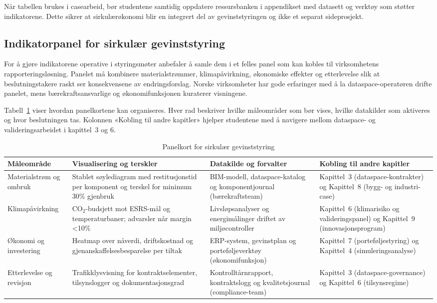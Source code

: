 Når tabellen brukes i casearbeid, bør studentene samtidig oppdatere ressursbanken i appendikset med datasett og verktøy som støtter indikatorene. Dette sikrer at sirkulærøkonomi blir en integrert del av gevinststyringen og ikke et separat sideprosjekt.

\subsection*{Indikatorpanel for sirkulær gevinststyring}
For å gjøre indikatorene operative i styringsmøter anbefaler \citet{miljodir2024indikatorveileder} å samle dem i et felles panel som kan kobles til virksomhetens rapporteringsløsning. Panelet må kombinere materialstrømmer, klimapåvirkning, økonomiske effekter og etterlevelse slik at beslutningstakere raskt ser konsekvensene av endringsforslag. Norske virksomheter har gode erfaringer med å la dataspace-operatøren drifte panelet, mens bærekraftsansvarlige og økonomifunksjonen kuraterer visningene.\citep{dfo2023baerekraft,hydro2023traceability}

Tabell~\ref{tab:sirkular-panel} viser hvordan panelkortene kan organiseres. Hver rad beskriver hvilke måleområder som bør vises, hvilke datakilder som aktiveres og hvor beslutningen tas. Kolonnen «Kobling til andre kapitler» hjelper studentene med å navigere mellom dataspace- og valideringsarbeidet i kapittel~3 og 6.

\begin{table}[h]
    \centering
    \caption{Panelkort for sirkulær gevinststyring}
    \label{tab:sirkular-panel}
    \begin{tabular}{p{3.1cm}p{3.8cm}p{3.6cm}p{3.4cm}}
        \toprule
        Måleområde & Visualisering og terskler & Datakilde og forvalter & Kobling til andre kapitler \\
        \midrule
        Materialstrøm og ombruk & Stablet søylediagram med restitusjonstid per komponent og terskel for minimum 30\% gjenbruk & BIM-modell, dataspace-katalog og komponentjournal (bærekraftsteam) & Kapittel~3 (dataspace-kontrakter) og Kapittel~8 (bygg- og industri-case) \\
        \addlinespace
        Klimapåvirkning & CO$_2$-budsjett mot ESRS-mål og temperaturbaner; advarsler når margin <10\% & Livsløpsanalyser og energimålinger driftet av miljøcontroller & Kapittel~6 (klimarisiko og valideringspanel) og Kapittel~9 (innovasjonsprogram) \\
        \addlinespace
        Økonomi og investering & Heatmap over nåverdi, driftskostnad og gjenanskaffelsesbesparelse per tiltak & ERP-system, gevinstplan og porteføljeverktøy (økonomifunksjon) & Kapittel~7 (porteføljestyring) og Kapittel~4 (simuleringsanalyse) \\
        \addlinespace
        Etterlevelse og revisjon & Trafikklysvisning for kontraktselementer, tilsynslogger og dokumentasjonsgrad & Kontrolltårnrapport, kontraktslogg og kvalitetsjournal (compliance-team) & Kapittel~3 (dataspace-governance) og Kapittel~6 (tilsynsregime) \\
        \bottomrule
    \end{tabular}
\end{table}

